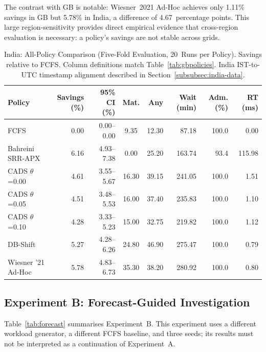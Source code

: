 \documentclass[conference]{IEEEtran}
\begin{document}
The contrast with GB is notable: Wiesner~2021 Ad-Hoc achieves only 1.11\%
savings in GB but 5.78\% in India, a difference of 4.67~percentage points.
This large region-sensitivity provides direct empirical evidence that cross-region
evaluation is necessary: a policy's savings are not stable across grids.

\begin{table}[t]
\caption{India: All-Policy Comparison (Five-Fold Evaluation, 20~Runs per Policy).\newline
\footnotesize Savings relative to FCFS. Column definitions match Table~\ref{tab:gbpolicies}.
India IST-to-UTC timestamp alignment described in Section~\ref{subsubsec:india-data}.}
\label{tab:indiapolicies}
\centering
\footnotesize
\begin{tabular}{@{}lrrcrrrr@{}}
\toprule
\textbf{Policy} & \textbf{Savings (\%)} & \textbf{95\% CI (\%)} & \textbf{Mat.} & \textbf{Any} & \textbf{Wait (min)} & \textbf{Adm. (\%)} & \textbf{RT (ms)} \\
\midrule
FCFS                  & 0.00 & 0.00--0.00 &  9.35 & 12.30 &  87.18 & 100.0 &   0.00 \\
Bahreini SRR-APX      & 6.16 & 4.93--7.38 &  0.00 & 25.20 & 163.74 &  93.4 & 115.98 \\
CADS $\theta$=0.00    & 4.61 & 3.55--5.67 & 16.30 & 39.15 & 241.05 & 100.0 &   1.51 \\
CADS $\theta$=0.05    & 4.51 & 3.48--5.53 & 16.00 & 37.40 & 235.83 & 100.0 &   1.10 \\
CADS $\theta$=0.10    & 4.28 & 3.33--5.23 & 15.00 & 32.75 & 219.82 & 100.0 &   1.12 \\
DB-Shift              & 5.27 & 4.28--6.26 & 24.80 & 46.90 & 275.47 & 100.0 &   0.79 \\
Wiesner '21 Ad-Hoc    & 5.78 & 4.83--6.73 & 35.30 & 38.20 & 280.92 & 100.0 &   0.80 \\
\bottomrule
\end{tabular}
\end{table}

\subsection{Experiment B: Forecast-Guided Investigation}

Table~\ref{tab:forecast} summarises Experiment~B. This experiment uses a
different workload generator, a different FCFS baseline, and three seeds; its
results must not be interpreted as a continuation of Experiment~A.
\end{document}
